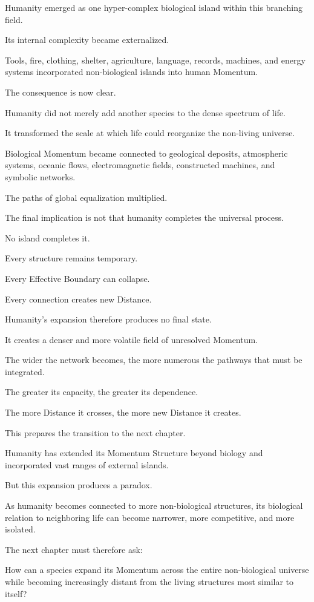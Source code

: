 Humanity emerged as one hyper-complex biological island within this branching field.

Its internal complexity became externalized.

Tools, fire, clothing, shelter, agriculture, language, records, machines, and energy systems incorporated non-biological islands into human Momentum.

The consequence is now clear.

Humanity did not merely add another species to the dense spectrum of life.

It transformed the scale at which life could reorganize the non-living universe.

Biological Momentum became connected to geological deposits, atmospheric systems, oceanic flows, electromagnetic fields, constructed machines, and symbolic networks.

The paths of global equalization multiplied.

The final implication is not that humanity completes the universal process.

No island completes it.

Every structure remains temporary.

Every Effective Boundary can collapse.

Every connection creates new Distance.

Humanity’s expansion therefore produces no final state.

It creates a denser and more volatile field of unresolved Momentum.

The wider the network becomes, the more numerous the pathways that must be integrated.

The greater its capacity, the greater its dependence.

The more Distance it crosses, the more new Distance it creates.

This prepares the transition to the next chapter.

Humanity has extended its Momentum Structure beyond biology and incorporated vast ranges of external islands.

But this expansion produces a paradox.

As humanity becomes connected to more non-biological structures, its biological relation to neighboring life can become narrower, more competitive, and more isolated.

The next chapter must therefore ask:

How can a species expand its Momentum across the entire non-biological universe while becoming increasingly distant from the living structures most similar to itself?

